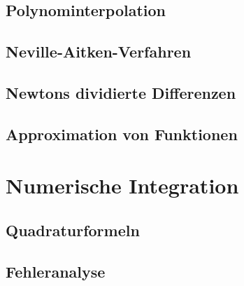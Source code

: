 \subsection{Polynominterpolation}
\subsection{Neville-Aitken-Verfahren}
\subsection{Newtons dividierte Differenzen}
\subsection{Approximation von Funktionen}

\section{Numerische Integration}
\subsection{Quadraturformeln}
\subsection{Fehleranalyse}
\clearpage
